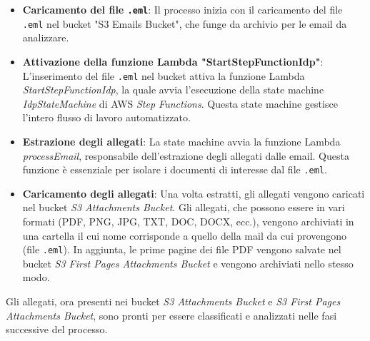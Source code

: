 \begin{itemize}
    \item \textbf{Caricamento del file \texttt{.eml}}: Il processo inizia con il caricamento del file \texttt{.eml} nel bucket "S3 Emails Bucket", che funge da archivio per le email da analizzare.
    
    \item \textbf{Attivazione della funzione Lambda "StartStepFunctionIdp"}: L'inserimento del file \texttt{.eml} nel bucket attiva la funzione Lambda \emph{StartStepFunctionIdp}, la quale avvia l'esecuzione della state machine \emph{IdpStateMachine} di AWS \emph{Step Functions}. Questa state machine gestisce l'intero flusso di lavoro automatizzato.

    \item \textbf{Estrazione degli allegati}: La state machine avvia la funzione Lambda \emph{processEmail}, responsabile dell'estrazione degli allegati dalle email. Questa funzione è essenziale per isolare i documenti di interesse dal file \texttt{.eml}.
    \item \textbf{Caricamento degli allegati}: Una volta estratti, gli allegati vengono caricati nel bucket \emph{S3 Attachments Bucket}. Gli allegati, che possono essere in vari formati (PDF, PNG, JPG, TXT, DOC, DOCX, ecc.), vengono archiviati in una cartella il cui nome corrisponde a quello della mail da cui provengono (file \texttt{.eml}). In aggiunta, le prime pagine dei file PDF vengono salvate nel bucket \emph{S3 First Pages Attachments Bucket} e vengono archiviati nello stesso modo. 
\end{itemize}
Gli allegati, ora presenti nei bucket \emph{S3 Attachments Bucket} e \emph{S3 First Pages Attachments Bucket}, sono pronti per essere classificati e analizzati nelle fasi successive del processo. 
